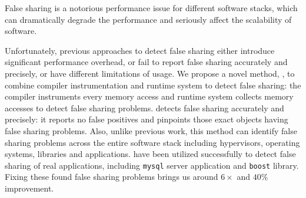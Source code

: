 
\begin{comment}
False sharing is notorious for performance degradation in multithreaded
programs. It apprears when two or more threads running on different cores periodically access 
different portions of data that can fit into one cache line. Since caching
system in a multicore processor needs to ensure a coherent view of memory
accross all cores, it has to grant an exclusive access
for each write operation by invidating duplicate copies in other cores. As a
result, frequent cache invalidation can seriously affect the scalability and
performance of multithreaded programs.
\end{comment} 

False sharing is a notorious performance issue for different software stacks, 
which can dramatically degrade the performance and seriously affect the scalability 
of software.

Unfortunately, previous approaches to detect false sharing
either introduce significant performance overhead, or fail
to report false sharing accurately and precisely, or have different limitations of usage. 
We propose a novel method, , to combine compiler instrumentation
and runtime system to detect false sharing: 
the compiler instruments every memory access and 
runtime system collects memory accesses to detect false sharing problems.
 detects false sharing accurately and precisely: it reports no 
false positives and pinpoints those exact objects having false sharing problems.
Also, unlike previous work, this method can
identify false sharing problems across the entire software stack including 
hypervisors, operating systems, libraries and applications. 
 have been utilized successfully to detect false sharing of real applications,
including \texttt{mysql} server application and \texttt{boost} library. Fixing these found
false sharing problems brings us around $6\times$ and $40\%$ improvement.

